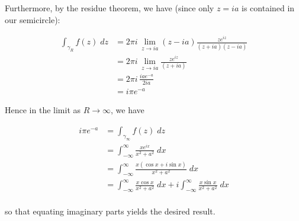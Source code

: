 \begin{solution}
  Furthermore, by the residue theorem, we have (since only $z = i a$ is contained in our semicircle):

  \begin{align*}
    \int_{\gamma_R} { f(z) \; dz } &= 2 \pi i \, \lim\limits_{z \to ia} (z - ia) \frac{z e^{iz}}{(z + ia) (z - ia)} \\
                                   &= 2 \pi i \, \lim\limits_{z \to ia} \frac{z e^{iz}}{(z + ia)} \\
                                   &= 2 \pi i \, \frac{ia e^{-a}}{2ia} \\
                                   &= i \pi e^{-a}
  \end{align*}

  Hence in the limit as $R \to \infty$, we have

  \begin{align*}
    i \pi e^{-a} &= \int_{\gamma_{\infty}} { f(z) \; dz } \\
                 &= \int_{-\infty}^{\infty} { \frac{x e^{i x}}{x^2 + a^2} \; dx } \\
                 &= \int_{-\infty}^{\infty} { \frac{x (\cos{x} + i \sin{x})}{x^2 + a^2} \; dx } \\
                 &= \int_{-\infty}^{\infty} { \frac{x \cos{x}}{x^2 + a^2} \; dx }
                  + i \int_{-\infty}^{\infty} { \frac{x \sin{x}}{x^2 + a^2} \; dx }  \\
  \end{align*}

  so that equating imaginary parts yields the desired result.
  \ \\
\end{solution}